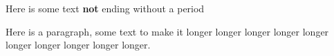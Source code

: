 Here is some text \textbf{not} ending without a period

Here is a paragraph, some text to make it longer longer longer longer longer
longer longer longer longer longer.
